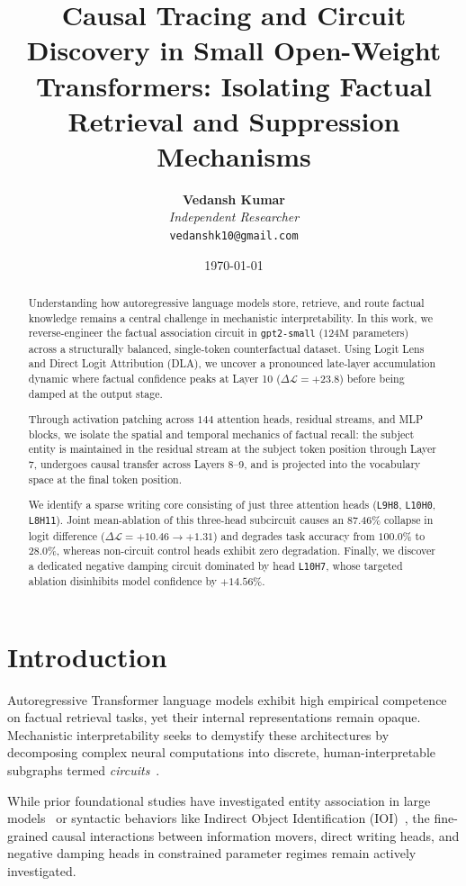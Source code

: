 \documentclass[10pt,twocolumn,letterpaper]{article}
\title{\textbf{Causal Tracing and Circuit Discovery in Small Open-Weight Transformers: Isolating Factual Retrieval and Suppression Mechanisms}}
\author{
  \textbf{Vedansh Kumar} \\
  \textit{Independent Researcher} \\
  \texttt{vedanshk10@gmail.com}
}
\date{\today}
\begin{document}
\maketitle

\begin{abstract}
Understanding how autoregressive language models store, retrieve, and route factual knowledge remains a central challenge in mechanistic interpretability. In this work, we reverse-engineer the factual association circuit in \texttt{gpt2-small} ($124\text{M}$ parameters) across a structurally balanced, single-token counterfactual dataset. Using Logit Lens and Direct Logit Attribution (DLA), we uncover a pronounced late-layer accumulation dynamic where factual confidence peaks at Layer 10 ($\Delta \mathcal{L} = +23.8$) before being damped at the output stage. 

Through activation patching across $144$ attention heads, residual streams, and MLP blocks, we isolate the spatial and temporal mechanics of factual recall: the subject entity is maintained in the residual stream at the subject token position through Layer 7, undergoes causal transfer across Layers 8--9, and is projected into the vocabulary space at the final token position. 

We identify a sparse writing core consisting of just three attention heads (\texttt{L9H8}, \texttt{L10H0}, \texttt{L8H11}). Joint mean-ablation of this three-head subcircuit causes an $87.46\%$ collapse in logit difference ($\Delta \mathcal{L} = +10.46 \rightarrow +1.31$) and degrades task accuracy from $100.0\%$ to $28.0\%$, whereas non-circuit control heads exhibit zero degradation. Finally, we discover a dedicated negative damping circuit dominated by head \texttt{L10H7}, whose targeted ablation disinhibits model confidence by $+14.56\%$.
\end{abstract}

\section{Introduction}
Autoregressive Transformer language models exhibit high empirical competence on factual retrieval tasks, yet their internal representations remain opaque. Mechanistic interpretability seeks to demystify these architectures by decomposing complex neural computations into discrete, human-interpretable subgraphs termed \textit{circuits}~\cite{elhasy2021transformer, wang2022interpretability}.

While prior foundational studies have investigated entity association in large models~\cite{meng2022locating} or syntactic behaviors like Indirect Object Identification (IOI)~\cite{wang2022interpretability}, the fine-grained causal interactions between information movers, direct writing heads, and negative damping heads in constrained parameter regimes remain actively investigated.
\end{document}
